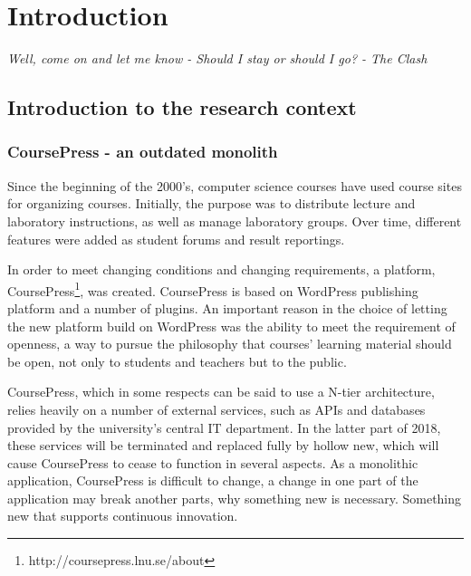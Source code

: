 \documentclass[a4paper,12pt]{article} %
\begin{document}
\section{Introduction}
\quad\emph{Well, come on and let me know -
Should I stay or should I go? - The Clash}\\

 
\subsection{Introduction to the research context}

\subsubsection{CoursePress - an outdated monolith}

Since the beginning of the 2000's, computer science courses have used course sites for organizing courses. Initially, the purpose was to distribute lecture and laboratory instructions, as well as manage laboratory groups. Over time, different features were added as student forums and result reportings.

In order to meet changing conditions and changing requirements, a platform, CoursePress\footnote{http://coursepress.lnu.se/about}, was created. CoursePress is based on WordPress publishing platform and a number of plugins. An important reason in the choice of letting the new platform build on WordPress was the ability to meet the requirement of openness, a way to pursue the philosophy that courses’ learning material should be open, not only to students and teachers but to the public.

CoursePress, which in some respects can be said to use a N-tier architecture, relies heavily on a number of external services, such as APIs and databases provided by the university's central IT department. In the latter part of 2018, these services will be terminated and replaced fully by hollow new, which will cause CoursePress to cease to function in several aspects. As a monolithic application, CoursePress is difficult to change, a change in one part of the application may break another parts, why something new is necessary. Something new that supports continuous innovation.
\end{document}
